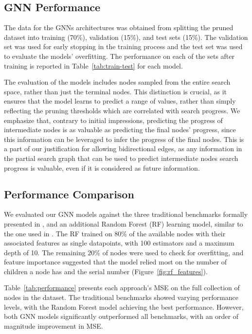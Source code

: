 \documentclass[letterpaper]{article}
\begin{document}
\subsection{GNN Performance}

The data for the GNNs architectures was obtained from splitting the pruned dataset into training (70\%), validation (15\%), and test sets (15\%). The validation set was used for early stopping in the training process and the test set was used to evaluate the models' overfitting. The performance on each of the sets after training is reported in Table~\ref{tab:train-test} for each model.

The evaluation of the models includes nodes sampled from the entire search space, rather than just the terminal nodes. This distinction is crucial, as it ensures that the model learns to predict a range of values, rather than simply reflecting the pruning thresholds which are correlated with search progress. We emphasize that, contrary to initial impressions, predicting the progress of intermediate nodes is as valuable as predicting the final nodes' progress, since this information can be leveraged to infer the progress of the final nodes. This is a part of our justification for allowing bidirectional edges, as any information in the partial search graph that can be used to predict intermediate nodes search progress is valuable, even if it is considered as future information.

\subsection{Performance Comparison}

We evaluated our GNN models against the three traditional benchmarks formally presented in ,
and an additional Random Forest (RF) learning model, similar to the one used in \citet{sudry2022learning}.
The RF trained on $80\%$ of the available nodes with their associated features as single datapoints, with 100 estimators and a maximum depth of 10. The remaining $20\%$ of nodes were used to check for overfitting, and feature importance suggested that the model relied most on the number of children a node has and the serial number (Figure~\ref{fig:rf_features}).

Table~\ref{tab:performance} presents each approach's MSE on the full collection of nodes in the dataset. The traditional benchmarks showed varying performance levels, with the Random Forest model achieving the best performance. However, both GNN models significantly outperformed all benchmarks, with an order of magnitude improvement in MSE.
\end{document}
